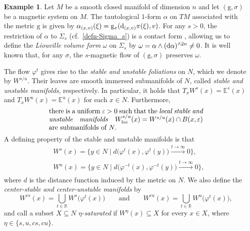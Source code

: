 \documentclass[10pt,a4paper]{amsart}
\newcommand{\g}{\mathrm{g}}
\numberwithin{equation}{section}
\theoremstyle{definition}
\newtheorem{Example}[Theorem]{Example}
\begin{document}
\begin{Example} Let $M$ be a smooth closed manifold of dimension $n$ and let $(\g, \sigma)$ be a magnetic system on $M$. The tautological $1$-form $\alpha$ on $TM$ associated with the metric $\g$ is given by \mbox{$\alpha_{(x,v)}(\xi) = \g_x({\rm d}_{(x,v)}\pi(\xi), v)$}. For any $s>0$, the restriction of $\alpha$ to $\Sigma_s$ (cf.\ \eqref{defn-Sigma_s}) is a contact form \cite{paternain1999geodesic}, allowing us to define the \emph{Liouville volume form} $\omega$ on $\Sigma_s$ by $\omega = \alpha \wedge ({\rm d}\alpha)^{\wedge 2n}\neq 0$. It is well known that, for any $\sigma$, the $s$-magnetic flow of $(\g,\sigma)$ preserves $\omega$.
\end{Example}

The flow $\varphi^t$ gives rise to the \emph{stable and unstable foliations} on $N$, which we denote by $W^{s/u}$. Their leaves are smooth immersed submanifolds of $N$, called \emph{stable and unstable manifolds}, respectively. In particular, it holds that $T_xW^s(x) = \mathbb{E}^s(x)$ and $T_xW^u(x) = \mathbb{E}^u(x)$ for each $x\in N$. Furthermore,
\begin{equation}\label{local-s/u}
 \parbox{.66\textwidth}{there is a uniform $\varepsilon > 0$ such that the \emph{local stable and unstable manifolds} ${W^{s/u}_{\rm loc}(x) = W^{s/u}(x) \cap B(x, \varepsilon)}$ are submanifolds of $N$.}
\end{equation}
A defining property of the stable and unstable manifolds is that
\begin{equation}\label{Ws-bounded-distance} \begin{split}
&W^s(x) = \bigl\{y \in N \mid d\bigl(\varphi^t(x), \varphi^t(y)\bigr) \xrightarrow[]{t \rightarrow \infty} 0\bigr\},
 \\
& W^u(x) = \bigl\{ y \in N \mid d\bigl(\varphi^{-t}(x), \varphi^{-t}(y)\bigr) \xrightarrow[]{t \rightarrow \infty} 0\bigr\}, \end{split}\end{equation}where $d$ is
 the distance function induced by the metric on $N$. We also define the \emph{center-stable and center-unstable manifolds} by
\begin{equation}\label{center-stable} W^{cs}(x) = \bigcup_{t \in \mathbb{R}} W^s\bigl(\varphi^t(x)\bigr) \qquad\text{and}\qquad W^{cu}(x) = \bigcup_{t \in \mathbb{R}} W^u\bigl(\varphi^t(x)\bigr),\end{equation}and call a subset $X \subseteq N$ \emph{$\eta$-saturated} if $W^\eta(x) \subseteq X$ for every $x \in X$, where \mbox{$\eta \in \{s, u, cs, cu\}$.}
\end{document}

